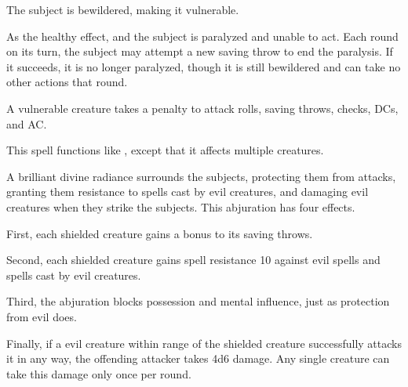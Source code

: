\spellrng{\rngclose}
\begin{spellhealthy}
  The subject is bewildered, making it vulnerable.
\end{spellhealthy}
\begin{spellblood}
  As the healthy effect, and the subject is paralyzed and unable to act. Each round on its turn, the subject may attempt a new saving throw to end the paralysis. If it succeeds, it is no longer paralyzed, though it is still bewildered and can take no other actions that round.
\end{spellblood}
\begin{spellnotes}
  A vulnerable creature takes a  penalty to attack rolls, saving throws, checks, DCs, and AC.
\end{spellnotes}

\spellrng{\rngmed}
\begin{spelleffect}
  This spell functions like , except that it affects multiple creatures.
\end{spelleffect}

\begin{spelleffect}
  A brilliant divine radiance surrounds the subjects, protecting them from attacks, granting them resistance to spells cast by evil creatures, and damaging evil creatures when they strike the subjects. This abjuration has four effects.
  \par First, each shielded creature gains a  bonus to its saving throws.
  \par Second, each shielded creature gains spell resistance 10 against evil spells and spells cast by evil creatures.
  \par Third, the abjuration blocks possession and mental influence, just as protection from evil does.
  \par Finally, if a evil creature within \rngmed range of the shielded creature successfully attacks it in any way, the offending attacker takes 4d6 damage. Any single creature can take this damage only once per round.
\end{spelleffect}

